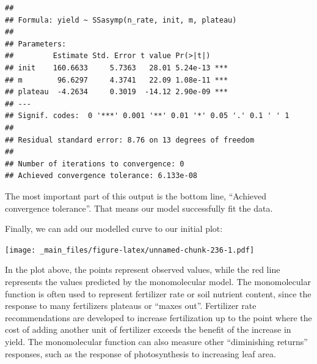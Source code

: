\documentclass[
]{book}
\newenvironment{Shaded}{\begin{snugshade}}{\end{snugshade}}
\newcommand{\AttributeTok}[1]{\textcolor[rgb]{0.77,0.63,0.00}{#1}}
\newcommand{\DecValTok}[1]{\textcolor[rgb]{0.00,0.00,0.81}{#1}}
\newcommand{\FunctionTok}[1]{\textcolor[rgb]{0.00,0.00,0.00}{#1}}
\newcommand{\NormalTok}[1]{#1}
\newcommand{\OtherTok}[1]{\textcolor[rgb]{0.56,0.35,0.01}{#1}}
\newcommand{\SpecialCharTok}[1]{\textcolor[rgb]{0.00,0.00,0.00}{#1}}
\newcommand{\StringTok}[1]{\textcolor[rgb]{0.31,0.60,0.02}{#1}}
\begin{document}
\begin{verbatim}
## 
## Formula: yield ~ SSasymp(n_rate, init, m, plateau)
## 
## Parameters:
##         Estimate Std. Error t value Pr(>|t|)    
## init    160.6633     5.7363   28.01 5.24e-13 ***
## m        96.6297     4.3741   22.09 1.08e-11 ***
## plateau  -4.2634     0.3019  -14.12 2.90e-09 ***
## ---
## Signif. codes:  0 '***' 0.001 '**' 0.01 '*' 0.05 '.' 0.1 ' ' 1
## 
## Residual standard error: 8.76 on 13 degrees of freedom
## 
## Number of iterations to convergence: 0 
## Achieved convergence tolerance: 6.133e-08
\end{verbatim}

The most important part of this output is the bottom line, ``Achieved convergence tolerance''. That means our model successfully fit the data.

Finally, we can add our modelled curve to our initial plot:

\begin{Shaded}
\end{Shaded}

\texttt{[image: \_main\_files/figure-latex/unnamed-chunk-236-1.pdf]}

In the plot above, the points represent observed values, while the red line represents the values predicted by the monomolecular model. The monomolecular function is often used to represent fertilizer rate or soil nutrient content, since the response to many fertilizers plateaus or ``maxes out''. Fertilizer rate recommendations are developed to increase fertilization up to the point where the cost of adding another unit of fertilizer exceeds the benefit of the increase in yield. The monomolecular function can also measure other ``diminishing returns'' responses, such as the response of photosynthesis to increasing leaf area.
\end{document}
